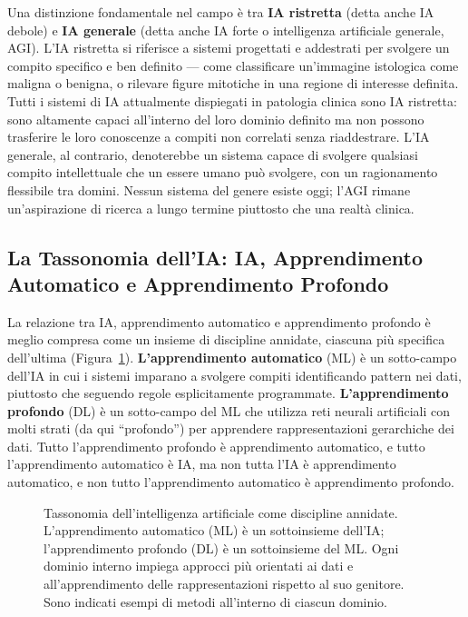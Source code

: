 Una distinzione fondamentale nel campo è tra \textbf{IA ristretta} (detta anche IA debole) e \textbf{IA generale} (detta anche IA forte o intelligenza artificiale generale, AGI). L'IA ristretta si riferisce a sistemi progettati e addestrati per svolgere un compito specifico e ben definito — come classificare un'immagine istologica come maligna o benigna, o rilevare figure mitotiche in una regione di interesse definita. Tutti i sistemi di IA attualmente dispiegati in patologia clinica sono IA ristretta: sono altamente capaci all'interno del loro dominio definito ma non possono trasferire le loro conoscenze a compiti non correlati senza riaddestrare. L'IA generale, al contrario, denoterebbe un sistema capace di svolgere qualsiasi compito intellettuale che un essere umano può svolgere, con un ragionamento flessibile tra domini. Nessun sistema del genere esiste oggi; l'AGI rimane un'aspirazione di ricerca a lungo termine piuttosto che una realtà clinica.

\subsection{La Tassonomia dell'IA: IA, Apprendimento Automatico e Apprendimento Profondo}

La relazione tra IA, apprendimento automatico e apprendimento profondo è meglio compresa come un insieme di discipline annidate, ciascuna più specifica dell'ultima (Figura~\ref{fig:ai_taxonomy}). \textbf{L'apprendimento automatico} (ML) è un sotto-campo dell'IA in cui i sistemi imparano a svolgere compiti identificando pattern nei dati, piuttosto che seguendo regole esplicitamente programmate. \textbf{L'apprendimento profondo} (DL) è un sotto-campo del ML che utilizza reti neurali artificiali con molti strati (da qui ``profondo'') per apprendere rappresentazioni gerarchiche dei dati. Tutto l'apprendimento profondo è apprendimento automatico, e tutto l'apprendimento automatico è IA, ma non tutta l'IA è apprendimento automatico, e non tutto l'apprendimento automatico è apprendimento profondo.

\begin{figure}[htbp]
    \centering
    
    \caption{Tassonomia dell'intelligenza artificiale come discipline annidate. L'apprendimento automatico (ML) è un sottoinsieme dell'IA; l'apprendimento profondo (DL) è un sottoinsieme del ML. Ogni dominio interno impiega approcci più orientati ai dati e all'apprendimento delle rappresentazioni rispetto al suo genitore. Sono indicati esempi di metodi all'interno di ciascun dominio.}
    \label{fig:ai_taxonomy}
\end{figure}

